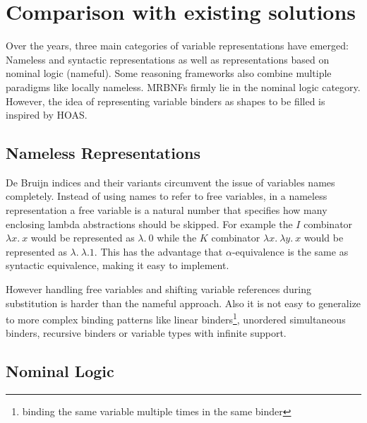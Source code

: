 \chapter{Comparison with existing solutions}\label{chapter:comparison}

Over the years, three main categories of variable representations have emerged: Nameless and syntactic representations as well as representations based on nominal logic\cite{nominal_logic} (nameful). Some reasoning frameworks also combine multiple paradigms like locally nameless\cite{locally_nameless}. \acp{MRBNF} firmly lie in the nominal logic category. However, the idea of representing variable binders as shapes to be filled is inspired by \ac{HOAS}.

\section{Nameless Representations}

De Bruijn indices\cite{deBruijn} and their variants circumvent the issue of variables names completely. Instead of using names to refer to free variables, in a nameless representation a free variable is a natural number that specifies how many enclosing lambda abstractions should be skipped. For example the $I$ combinator $\lambda x. \: x$ would be represented as $\lambda. \: 0$ while the $K$ combinator $\lambda x. \: \lambda y. \: x$ would be represented as $\lambda. \: \lambda. 1$. This has the advantage that $\alpha$-equivalence is the same as syntactic equivalence, making it easy to implement.

However handling free variables and shifting variable references during substitution is harder than the nameful approach. Also it is not easy to generalize to more complex binding patterns like linear binders\footnote{binding the same variable multiple times in the same binder}, unordered simultaneous binders, recursive binders or variable types with infinite support.

\section{Nominal Logic}

